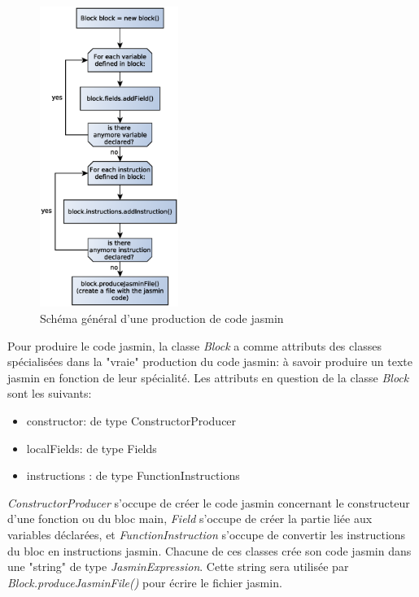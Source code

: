 \documentclass[11pt,a4paper]{article}
\begin{document}
  \newpage
    \begin{figure}[h]
    \includegraphics[width=0.4\textwidth,center]{../ressources/jasminFileProducionOverview.eps}
    \caption{Schéma général d'une production de code jasmin}
  \end{figure}
  
  \par Pour produire le code jasmin, la classe \textit{Block} a comme attributs des classes spécialisées dans la "vraie" production du code jasmin: à savoir produire un  texte jasmin en fonction de leur spécialité. Les attributs en question de la classe \textit{Block} sont les suivants: 
  
  \begin{itemize}
    \item constructor: de type ConstructorProducer
    \item localFields: de type Fields
    \item instructions : de type FunctionInstructions
  \end{itemize}
  
  \par \textit{ConstructorProducer} s'occupe de créer le code jasmin concernant le constructeur d'une fonction ou du bloc main, \textit{Field} s'occupe de créer la partie liée aux variables déclarées, et \textit{FunctionInstruction} s'occupe de convertir les instructions du bloc en instructions jasmin. Chacune de ces classes crée son code jasmin dans une "string" de type \textit{JasminExpression}. Cette string sera utilisée par \textit{Block.produceJasminFile()} pour écrire le fichier jasmin. 
  
\end{document}

